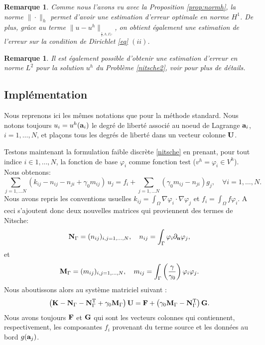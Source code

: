 \documentclass[11pt]{book}
\newtheorem{remark}[theorem]{Remarque}
\newcommand{\br}{\begin{remark}}
\newcommand{\er}{\end{remark}}
\def\n{{\bf n}}
\def\a{{\bf a}}
\def\F{{\bf F}}
\def\U{{\bf U}}
\def\K{{\bf K}}
\def\NN{{\bf N}}
\def\M{{\bf M}}
\def\G{{\Gamma}}
\def\GG{{\bf G}}
\newcommand{\caT}{{\cal T}}
\newcommand{\Gc}{\Gamma_{C}}
\newcommand{\npgc}[1]{\|{#1}\|_{_{\frac12,h,\Gc}}}
\begin{document}
\br Comme nous l'avons vu avec la Proposition \ref{prop:normh}, la norme $\| \cdot \|_h$ permet d'avoir une estimation d'erreur optimale en norme $H^1$. De plus, grâce au terme $\npgc{u - u^h}$, on obtient également une estimation de l'erreur sur la condition de Dirichlet \eqref{eq} $(ii)$.\er

\br Il est également possible d'obtenir une estimation d'erreur en norme $L^2$ pour la solution $u^h$ du Problème \eqref{nitsche2}, voir \cite[Theorem 2.2]{thomee-97} pour plus de détails. \er

\subsection{Implémentation}

Nous reprenons ici les mêmes notations que pour la méthode standard.
Nous notons toujours $u_i = u^h(\a_i)$ le degré de liberté associé au noeud de Lagrange $\a_i$, $i=1,\ldots,N$, et plaçons tous les degrés de liberté dans un vecteur colonne $\U$.

Testons maintenant la formulation faible discrète \eqref{nitsche} en prenant, pour tout indice $i \in 1,\ldots,N$, la fonction de base $\varphi_i$ comme fonction test ($v^h = \varphi_i \in V^h$). Nous obtenons:
\[
\sum_{j=1,\ldots N} (k_{ij} - n_{ij} - n_{ji} + \gamma_0 m_{ij}) \, u_j = f_i + 
\sum_{j=1,\ldots N} ( \gamma_0 m_{ij} - n_{ji} ) g_j , \quad \forall i = 1,\ldots,N.
\]
Nous avons repris les conventions usuelles $k_{ij} = \int_\Omega \nabla \varphi_i \cdot \nabla \varphi_j$ et $f_i = \int_\Omega f \varphi_i$. A ceci s'ajoutent donc deux nouvelles matrices qui proviennent des termes de Nitsche:
\[
\NN_\G = (n_{ij})_{i,j=1,\ldots,N} , \quad n_{ij} = \int_\Gamma \varphi_i \partial_\n \varphi_j,
\]
et
\[
\M_\G = (m_{ij})_{i,j=1,\ldots,N} , \quad m_{ij} = \int_\Gamma \left ( \frac{\gamma}{\gamma_0} \right )\varphi_i \varphi_j.
\]
Nous aboutissons alors au système matriciel suivant :
\[
 \left ( \K - \NN_\G - \NN_\G^{\mathrm{T}} + \gamma_0 \M_\G \right ) \U 
 = \F + \left ( \gamma_0 \M_\G -  \NN_\G^{\mathrm{T}} \right ) \GG.
\]
Nous avons toujours
 $\F$ et $\GG$ qui sont les vecteurs colonnes qui contiennent, respectivement, les composantes $f_i$ provenant du terme source et les données au bord $g(\a_j)$.
\end{document}
